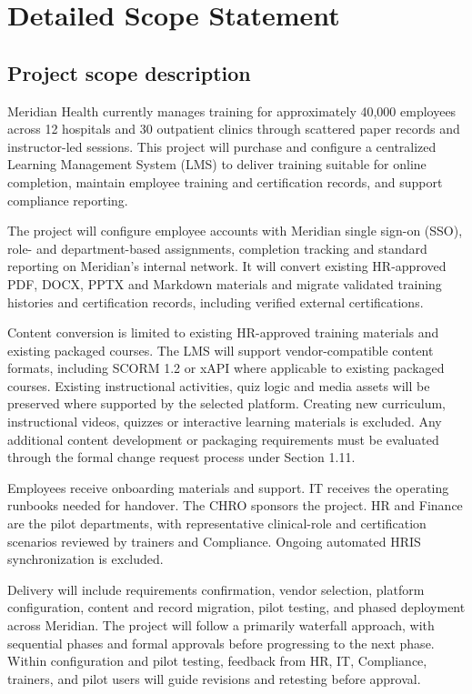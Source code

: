 
\clearpage
\section{Detailed Scope Statement}\label{sec:1}
\subsection{Project scope description}\label{sec:1.1}
Meridian Health currently manages training for approximately 40,000 employees across 12 hospitals and 30 outpatient clinics through scattered paper records and instructor-led sessions. This project will purchase and configure a centralized Learning Management System (LMS) to deliver training suitable for online completion, maintain employee training and certification records, and support compliance reporting.


The project will configure employee accounts with Meridian single sign-on (SSO), role- and department-based assignments, completion tracking and standard reporting on Meridian's internal network. It will convert existing HR-approved PDF, DOCX, PPTX and Markdown materials and migrate validated training histories and certification records, including verified external certifications.


Content conversion is limited to existing HR-approved training materials and existing packaged courses. The LMS will support vendor-compatible content formats, including SCORM 1.2 or xAPI where applicable to existing packaged courses. Existing instructional activities, quiz logic and media assets will be preserved where supported by the selected platform. Creating new curriculum, instructional videos, quizzes or interactive learning materials is excluded. Any additional content development or packaging requirements must be evaluated through the formal change request process under Section 1.11.


Employees receive onboarding materials and support. IT receives the operating runbooks needed for handover. The CHRO sponsors the project. HR and Finance are the pilot departments, with representative clinical-role and certification scenarios reviewed by trainers and Compliance. Ongoing automated HRIS synchronization is excluded.


Delivery will include requirements confirmation, vendor selection, platform configuration, content and record migration, pilot testing, and phased deployment across Meridian. The project will follow a primarily waterfall approach, with sequential phases and formal approvals before progressing to the next phase. Within configuration and pilot testing, feedback from HR, IT, Compliance, trainers, and pilot users will guide revisions and retesting before approval.


